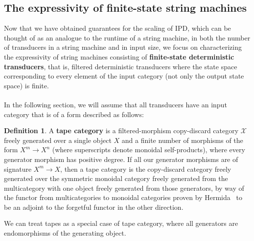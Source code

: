 \documentclass{article}
\theoremstyle{definition}
\newtheorem{definition}{Definition}[section]
\theoremstyle{remark}
\begin{document}
\subsection{The expressivity of finite-state string machines}
Now that we have obtained guarantees for the scaling of
$\mathrm{IPD}$, which can be thought of as an analogue to the
runtime of a string machine, in both the number of transducers
in a string machine and in input size, we focus on characterizing the
expressivity of string machines consisting of
\textbf{finite-state deterministic
transducers}, that is, filtered deterministic transducers where
the state space corresponding to every element of the input category
(not only the output state space)
is finite.
\\ \\
In the following section, we will assume that all transducers
have an input category that is of a form described as follows:
\begin{definition}
    \label{def:tapecategory} A \textbf{tape category} is a
    filtered-morphism
    copy-discard category $\mathcal{X}$
    freely generated over a single
    object $X$ and a finite number of morphisms of the form
    $X^m \to X^n$ (where superscripts denote monoidal self-products),
    where every generator morphism has positive degree. 
    If all our generator morphisms are of signature
    $X^m\to X$, then
    a tape
    category is the copy-discard category freely generated over the
    symmetric monoidal category freely generated from the multicategory
    with one object
    freely generated from those generators,
    by way of the functor from multicategories
    to monoidal categories proven by Hermida~\cite{hermida2000representable}
    to be an adjoint to the forgetful functor in the other
    direction.
\end{definition}
We can treat tapes as a special case of tape category, where
all generators are endomorphisms of the generating object.
\end{document}
